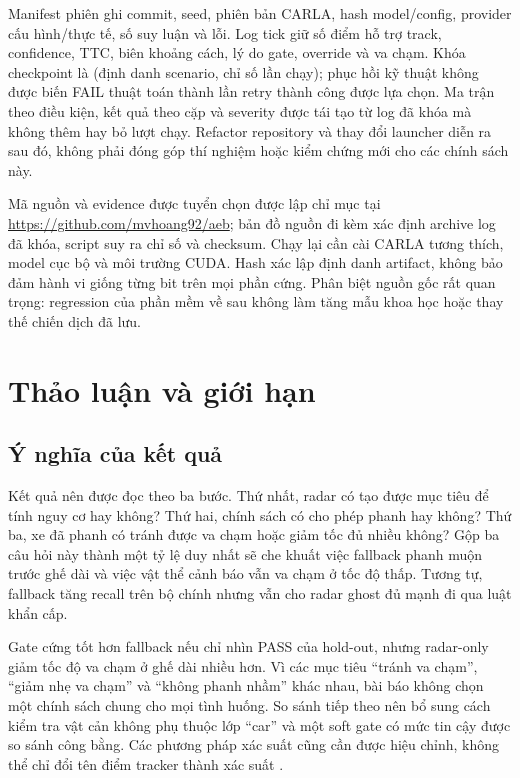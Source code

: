 \documentclass[conference]{IEEEtran}
\begin{document}
Manifest phiên ghi commit, seed, phiên bản CARLA, hash model/config, provider
cấu hình/thực tế, số suy luận và lỗi. Log tick giữ số điểm hỗ trợ track,
confidence, TTC, biên khoảng cách, lý do gate, override và va chạm. Khóa
checkpoint là (định danh scenario, chỉ số lần chạy); phục hồi kỹ thuật không
được biến FAIL thuật toán thành lần retry thành công được lựa chọn.
Ma trận theo điều kiện, kết quả theo cặp và severity được tái tạo từ log đã
khóa mà không thêm hay bỏ lượt chạy. Refactor repository và thay đổi
launcher diễn ra sau đó, không phải đóng góp thí nghiệm hoặc kiểm chứng mới
cho các chính sách này.

Mã nguồn và evidence được tuyển chọn được lập chỉ mục tại
\url{https://github.com/mvhoang92/aeb}; bản đồ nguồn đi kèm xác định archive
log đã khóa, script suy ra chỉ số và checksum. Chạy lại cần cài CARLA tương
thích, model cục bộ và môi trường CUDA. Hash xác lập định danh artifact,
không bảo đảm hành vi giống từng bit trên mọi phần cứng. Phân biệt nguồn
gốc rất quan trọng: regression của phần mềm về sau không làm tăng mẫu
khoa học hoặc thay thế chiến dịch đã lưu.

\section{Thảo luận và giới hạn}
\subsection{Ý nghĩa của kết quả}
Kết quả nên được đọc theo ba bước. Thứ nhất, radar có tạo được mục tiêu để
tính nguy cơ hay không? Thứ hai, chính sách có cho phép phanh hay không?
Thứ ba, xe đã phanh có tránh được va chạm hoặc giảm tốc đủ nhiều không?
Gộp ba câu hỏi này thành một tỷ lệ duy nhất sẽ che khuất việc fallback phanh
muộn trước ghế dài và việc vật thể cảnh báo vẫn va chạm ở tốc độ thấp.
Tương tự, fallback tăng recall trên bộ chính nhưng vẫn cho radar ghost đủ
mạnh đi qua luật khẩn cấp.

Gate cứng tốt hơn fallback nếu chỉ nhìn PASS của hold-out, nhưng radar-only
giảm tốc độ va chạm ở ghế dài nhiều hơn. Vì các mục tiêu ``tránh va chạm'',
``giảm nhẹ va chạm'' và ``không phanh nhầm'' khác nhau, bài báo không chọn
một chính sách chung cho mọi tình huống. So sánh tiếp theo nên bổ sung cách
kiểm tra vật cản không phụ thuộc lớp ``car'' và một soft gate có mức tin cậy
được so sánh công bằng. Các phương pháp xác suất cũng cần được hiệu chỉnh,
không thể chỉ đổi tên điểm tracker thành xác suất
\cite{sandblom2011threat,lindenmaier2022existence}.
\end{document}
